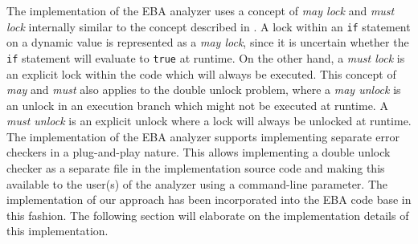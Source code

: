 \noindent The implementation of the EBA analyzer uses a concept of \textit{may lock} and \textit{must lock} internally similar to the concept described in \cite{Godefroid}. A lock within an \texttt{if} statement on a dynamic value is represented as a \textit{may lock}, since it is uncertain whether the \texttt{if} statement will evaluate to \texttt{true} at runtime. On the other hand, a \textit{must lock} is an explicit lock within the code which will always be executed. This concept of \textit{may} and \textit{must} also applies to the double unlock problem, where a \textit{may unlock} is an unlock in an execution branch which might not be executed at runtime. A \textit{must unlock} is an explicit unlock where a lock will always be unlocked at runtime. \\

\noindent The implementation of the EBA analyzer supports implementing separate error checkers in a plug-and-play nature. This allows implementing a double unlock checker as a separate file in the implementation source code and making this available to the user(s) of the analyzer using a command-line parameter. The implementation of our approach has been incorporated into the EBA code base in this fashion. The following section will elaborate on the implementation details of this implementation. 